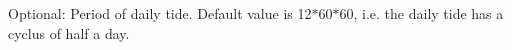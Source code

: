 Optional\+: Period of daily tide. Default value is 12$\ast$60$\ast$60, i.\+e. the daily tide has a cyclus of half a day. 
